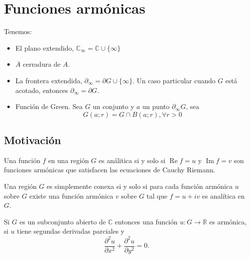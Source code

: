 






\section{Funciones armónicas}


\begin{cajita}
    \begin{nota}
        Tenemos:
        \begin{itemize}
            \item El plano extendido, $\mathbb{C}_{\infty}=\mathbb{C}\cup \{\infty\}$
            \item $\overline{A}$ cerradura de $A$. 
            \item La frontera extendida, $\partial_\infty=\partial G\cup \{\infty\}$. Un caso particular cuando $G$ está acotado, entonces $\partial_\infty=\partial G$.
            \item Función de Green. Sea $G$ un conjunto y $a$ un punto $\partial_\infty G$, sea 
            $$G(a;r)=G\cap B(a;r), \forall r>0$$
        \end{itemize}
    \end{nota}
\end{cajita}

\subsection{Motivación}



\begin{cajita}
    \begin{teorema}
        Una función $f$ en una región $G$ es análitica si y solo si $\operatorname{Re} f=u$ y $\operatorname{Im} f=v$ son funciones armónicas que satisfacen las ecuaciones de Cauchy Riemann.
    \end{teorema}
    \begin{teorema}
        Una región $G$  es simplemente conexa si y solo si para cada función armónica $u$ sobre $G$  existe una función armónica $v$ sobre $G$ tal que $f=u+i v$ es analítica en $G$.
    \end{teorema}
\end{cajita}



\begin{definicion}
    Si $G$ es un subconjunto abierto de $\mathbb{C}$ entonces una función $u:G \to \mathbb{R}$ es armónica, si $u$  tiene segundas derivadas parciales y 
$$
\frac{\partial^2 u}{\partial x^2}+\frac{\partial^2 u}{\partial y^2}=0 .
$$
\end{definicion}

